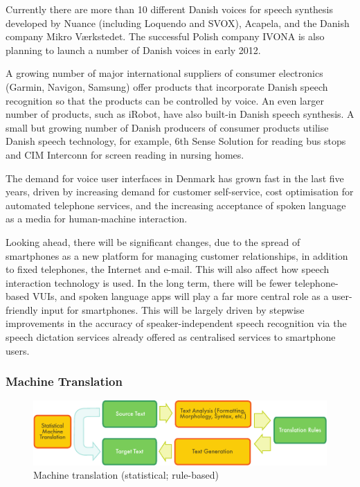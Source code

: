 \begin{multicols}{2}
Currently there are more than 10 different Danish voices for speech
synthesis developed by Nuance (including Loquendo and SVOX), Acapela,
and the Danish company Mikro V\ae rkstedet. The successful Polish
company IVONA is also planning to launch a number of Danish voices in
early 2012.

A growing number of major international suppliers of consumer
electronics (Garmin, Navigon, Samsung) offer products that incorporate
Danish speech recognition so that the products can be controlled by
voice. An even larger number of products, such as iRobot, have also
built-in Danish speech synthesis. A small but growing number of Danish
producers of consumer products utilise Danish speech technology, for
example, 6th Sense Solution for reading bus stops and CIM Interconn
for screen reading in nursing homes.

The demand for voice user interfaces in Denmark has grown fast in the last five years, driven by increasing demand for customer self-service, cost optimisation for automated telephone services, and the increasing acceptance of spoken language as a media for human-machine interaction. 

Looking ahead, there will be significant changes, due to the spread of smartphones as a new platform for managing customer relationships, in addition to fixed telephones, the Internet and e-mail. This will also affect how speech interaction technology is used. In the long term, there will be fewer telephone-based VUIs, and spoken language apps will play a far more central role as a user-friendly input for smartphones. This will be largely driven by stepwise improvements in the accuracy of speaker-independent speech recognition via the speech dictation services already offered as centralised services to smartphone users.

\subsubsection{Machine Translation}

\begin{figure}[htb]
  \center
  \includegraphics[width=\textwidth]{../_media/english/machine_translation}
  \caption{Machine translation (statistical; rule-based)}
  \label{fig:mtarch_en}
\end{figure}


\end{multicols}
